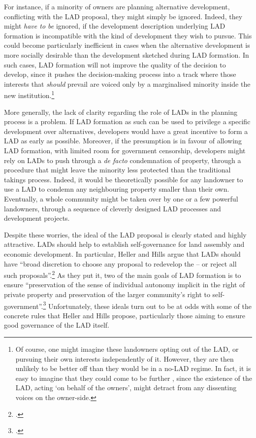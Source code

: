 For instance, if a minority of owners are planning alternative development, conflicting with the LAD proposal, they might simply be ignored. Indeed, they might {\it have to be} ignored, if the development description underlying LAD formation is incompatible with the kind of development they wish to pursue. This could become particularly inefficient in cases when the alternative development is more socially desirable than the development sketched during LAD formation. In such cases, LAD formation will not improve the quality of the decision to develop, since it pushes the decision-making process into a track where those interests that {\it should} prevail are voiced only by a marginalised minority inside the new institution.\footnote{Of course, one might imagine these landowners opting out of the LAD, or pursuing their own interests independently of it. However, they are then unlikely to be better off than they would be in a no-LAD regime. In fact, it is easy to imagine that they could come to be further , since the existence of the LAD, acting `on behalf of the owners', might detract from any dissenting voices on the owner-side.}

More generally, the lack of clarity regarding the role of LADs in the planning process is a problem. If LAD formation as such can be used to privilege a specific development over alternatives, developers would have a great incentive to form a LAD as early as possible. Moreover, if the presumption is in favour of allowing LAD formation, with limited room for government censorship, developers might rely on LADs to push through a {\it de facto} condemnation of property, through a procedure that might leave the minority less protected than the traditional takings process. Indeed, it would be theoretically possible for any landowner to use a LAD to condemn any neighbouring property smaller than their own. Eventually, a whole community might be taken over by one or a few powerful landowners, through a sequence of cleverly designed LAD processes and development projects. %

Despite these worries, the ideal of the LAD proposal is clearly stated and highly attractive. LADs should help to establish self-governance for land assembly and economic development. In particular, Heller and Hills argue that LADs should have ``broad discretion to choose any proposal to redevelop the  -- or reject all such proposals''.\footcite[See][1496]{heller08} As they put it, two of the main goals of LAD formation is to ensure ``preservation of the sense of individual autonomy implicit in the right of private property and preservation of the larger community's right to self-government''.\footcite[See][1498]{heller08} Unfortunately, these ideals turn out to be at odds with some of the concrete rules that Heller and Hills propose, particularly those aiming to ensure good governance of the LAD itself.

